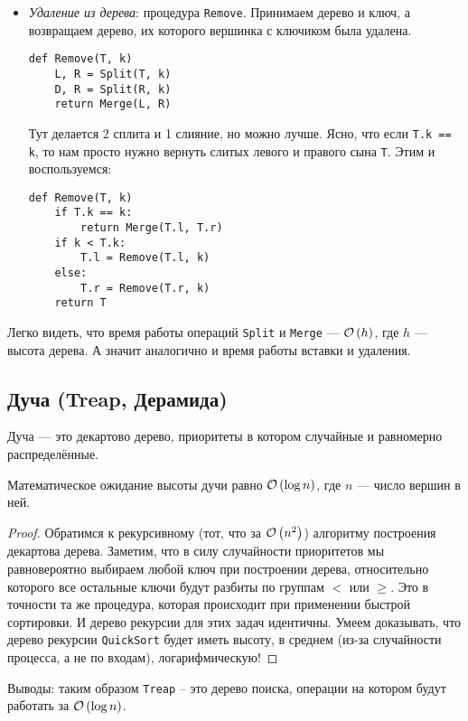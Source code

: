 \begin{itemize}
\item \emph{Удаление из дерева}: процедура \texttt{Remove}. Принимаем дерево и ключ, а возвращаем дерево, их которого вершинка с ключиком была удалена.
\begin{verbatim}
def Remove(T, k)
	L, R = Split(T, k)
	D, R = Split(R, k)
	return Merge(L, R)
\end{verbatim}
Тут делается 2 сплита и 1 слияние, но можно лучше. Ясно, что если \texttt{T.k == k}, то нам просто нужно вернуть слитых левого и правого сына \texttt{T}. Этим и воспользуемся:
\begin{verbatim}
def Remove(T, k)
    if T.k == k:
        return Merge(T.l, T.r)
    if k < T.k:
        T.l = Remove(T.l, k)
    else:
        T.r = Remove(T.r, k)
    return T
\end{verbatim}

\end{itemize}

\begin{note} 
Легко видеть, что время работы операций \texttt{Split} и \texttt{Merge} --- $\mathcal{O}\left(h\right)$, где $h$ --- высота дерева. А значит аналогично и время работы вставки и удаления.
\end{note}

\subsection{Дуча (Treap, Дерамида)}

\begin{defn}
Дуча --- это декартово дерево, приоритеты в котором случайные и равномерно распределённые.
\end{defn}
\begin{lem}
Математическое ожидание высоты дучи равно $\mathcal{O}\left(\log{n}\right)$, где $n$ --- число вершин в ней.
\end{lem}
\begin{proof}
Обратимся к рекурсивному (тот, что за $\mathcal{O}\left(n^2\right)$) алгоритму построения декартова дерева. Заметим, что в силу случайности приоритетов мы равновероятно выбираем любой ключ при построении дерева, относительно которого все остальные ключи будут разбиты по группам $<$ или $\geq$. Это в точности та же процедура, которая происходит при применении быстрой сортировки. И дерево рекурсии для этих задач идентичны. Умеем доказывать, что дерево рекурсии \texttt{QuickSort} будет иметь высоту, в среднем (из-за случайности процесса, а не по входам), логарифмическую! 
\end{proof}
Выводы: таким образом \texttt{Treap} -- это дерево поиска, операции на котором будут работать за $\mathcal{O}\left(\log{n}\right)$.

